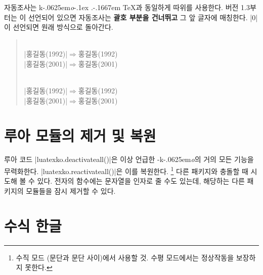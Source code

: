\documentclass[a4paper]{article}
\def\luatex{\hologo{LuaTeX}}
\def\logoko{\textsf{k}\kern-.0625em\textit{o}}
\def\luatexko{\luatex-\logoko}
\def\kotex{\logoko\kern-.1ex .\kern-.1667em \TeX}
\def\hemph#1{\textsf{\bfseries #1}}
\begin{document}
자동조사는 \kotex 과 동일하게      
      따위를 사용한다.
버전 1.3부터는 이 선언되어 있으면 자동조사는
\hemph{괄호 부분을 건너뛰고} 그 앞 글자에 매칭한다.
|0|이 선언되면 원래 방식으로 돌아간다.
\begin{quote}
    \\
  |홍길동(1992)\는|\quad$\Rightarrow$\quad 홍길동(1992)\는\\
  |홍길동(2001)\로|\quad$\Rightarrow$\quad 홍길동(2001)\로\par
    \\
  |홍길동(1992)\는|\quad$\Rightarrow$\quad 홍길동(1992)\는\\
  |홍길동(2001)\로|\quad$\Rightarrow$\quad 홍길동(2001)\로
\end{quote}

\section{루아 모듈의 제거 및 복원}\label{sec:luamodule}

루아 코드 |luatexko.deactivateall()|은 이상 언급한 \luatexko 의 거의 모든
기능을 무력화한다. |luatexko.reactivateall()|은 이를 복원한다.%
\footnote{수직 모드 (문단과 문단 사이)에서 사용할 것.
  수평 모드에서는 정상작동을 보장하지 못한다.}
다른 패키지와 충돌할 때 시도해 볼 수 있다.
전자의 함수에는 문자열을 인자로 줄 수도 있는데, 해당하는 다른 패키지의
모듈들을 잠시 제거할 수 있다.

\section{수식 한글}\label{sec:mathhangul}
\end{document}
